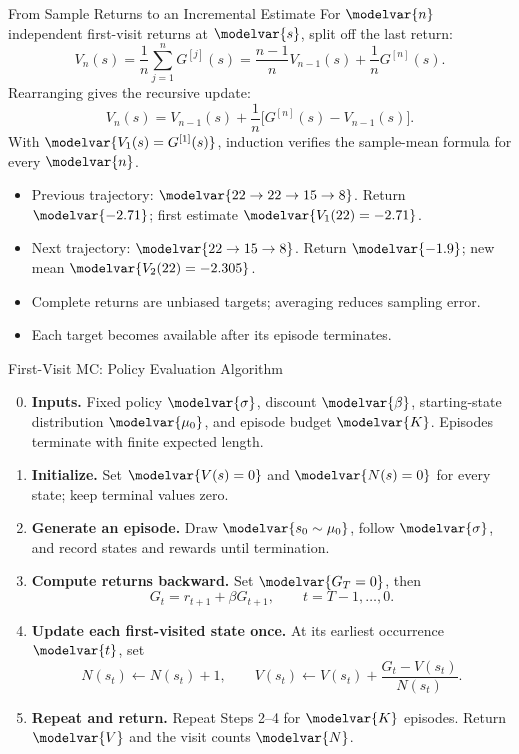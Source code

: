 \begin{frame}{From Sample Returns to an Incremental Estimate}
\small
For \(\modelvar{n}\) independent first-visit returns at \(\modelvar{s}\), split off the last return:
\[V_n(s)=\frac1n\sum_{j=1}^{n}G^{[j]}(s)
=\frac{n-1}{n}V_{n-1}(s)+\frac1nG^{[n]}(s).\]
Rearranging gives the recursive update:
\[V_n(s)=V_{n-1}(s)+\frac1n\bigl[G^{[n]}(s)-V_{n-1}(s)\bigr].\]
With \(\modelvar{V_1(s)=G^{[1]}(s)}\), induction verifies the sample-mean formula for every \(\modelvar{n}\).
\par
{}
\begin{itemize}
\item Previous trajectory: \(\modelvar{22\to22\to15\to8}\). Return \(\modelvar{-2.71}\); first estimate \(\modelvar{V_1(22)=-2.71}\).
\item Next trajectory: \(\modelvar{22\to15\to8}\). Return \(\modelvar{-1.9}\); new mean \(\modelvar{V_2(22)=-2.305}\).
\end{itemize}

\begin{itemize}
\item Complete returns are unbiased targets; averaging reduces sampling error.
\item Each target becomes available after its episode terminates.
\end{itemize}
\end{frame}

\begin{frame}{First-Visit MC: Policy Evaluation Algorithm}
\small
\begin{enumerate}
\setcounter{enumi}{-1}
\item \textbf{Inputs.} Fixed policy \(\modelvar{\sigma}\), discount \(\modelvar{\beta}\), starting-state distribution \(\modelvar{\mu_0}\), and episode budget \(\modelvar{K}\). Episodes terminate with finite expected length.
\item \textbf{Initialize.} Set \(\modelvar{V(s)=0}\) and \(\modelvar{N(s)=0}\) for every state; keep terminal values zero.
\item \textbf{Generate an episode.} Draw \(\modelvar{s_0\sim\mu_0}\), follow \(\modelvar{\sigma}\), and record states and rewards until termination.
\item \textbf{Compute returns backward.} Set \(\modelvar{G_T=0}\), then
\[G_t=r_{t+1}+\beta G_{t+1},\qquad t=T-1,\ldots,0.\]
\item \textbf{Update each first-visited state once.} At its earliest occurrence \(\modelvar{t}\), set
\[N(s_t)\leftarrow N(s_t)+1,\qquad
V(s_t)\leftarrow V(s_t)+\frac{G_t-V(s_t)}{N(s_t)}.\]
\item \textbf{Repeat and return.} Repeat Steps 2--4 for \(\modelvar{K}\) episodes. Return \(\modelvar{V}\) and the visit counts \(\modelvar{N}\).
\end{enumerate}
\end{frame}

